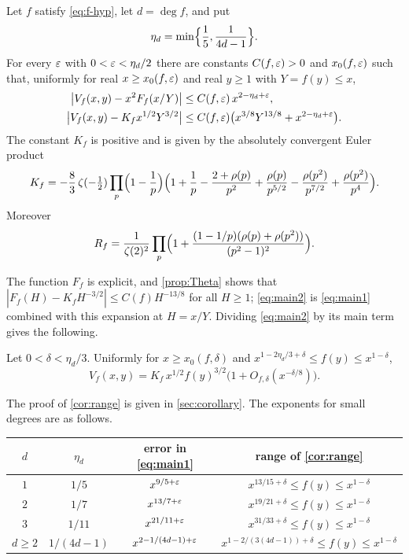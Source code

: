 \begin{theorem}\label{thm:main}
Let $f$ satisfy \eqref{eq:f-hyp}, let $d=\deg f$, and put
\[
\eta_d=\min\Bigl\{\frac15,\frac1{4d-1}\Bigr\}.
\]
For every $\varepsilon$ with $0<\varepsilon<\eta_d/2$ there are constants $C(f,\varepsilon)>0$ and $x_0(f,\varepsilon)$ such that, uniformly for real $x\ge x_0(f,\varepsilon)$ and real $y\ge1$ with $Y=f(y)\le x$,
\begin{align}
\bigl|V_f(x,y)-x^2F_f(x/Y)\bigr|&\le C(f,\varepsilon)\,x^{2-\eta_d+\varepsilon},\label{eq:main1}\\
\bigl|V_f(x,y)-K_fx^{1/2}Y^{3/2}\bigr|&\le C(f,\varepsilon)\bigl(x^{3/8}Y^{13/8}+x^{2-\eta_d+\varepsilon}\bigr).\label{eq:main2}
\end{align}
The constant $K_f$ is positive and is given by the absolutely convergent Euler product
\begin{equation}\label{eq:K-intro}
K_f=-\frac83\,\zeta(-\tfrac12)\prod_p\Bigl(1-\frac1p\Bigr)\Bigl(1+\frac1p-\frac{2+\rho(p)}{p^2}+\frac{\rho(p)}{p^{5/2}}-\frac{\rho(p^2)}{p^{7/2}}+\frac{\rho(p^2)}{p^4}\Bigr).
\end{equation}
Moreover
\begin{equation}\label{eq:R-intro}
R_f=\frac1{\zeta(2)^2}\prod_p\Bigl(1+\frac{(1-1/p)(\rho(p)+\rho(p^2))}{(p^2-1)^2}\Bigr).
\end{equation}
\end{theorem}

The function $F_f$ is explicit, and \cref{prop:Theta} shows that $|F_f(H)-K_fH^{-3/2}|\le C(f)H^{-13/8}$ for all $H\ge1$; \eqref{eq:main2} is \eqref{eq:main1} combined with this expansion at $H=x/Y$. Dividing \eqref{eq:main2} by its main term gives the following.

\begin{corollary}\label{cor:range}
Let $0<\delta<\eta_d/3$. Uniformly for $x\ge x_0(f,\delta)$ and $x^{1-2\eta_d/3+\delta}\le f(y)\le x^{1-\delta}$,
\[
V_f(x,y)=K_f\,x^{1/2}f(y)^{3/2}\bigl(1+O_{f,\delta}(x^{-\delta/8})\bigr).
\]
\end{corollary}

The proof of \cref{cor:range} is given in \cref{sec:corollary}. The exponents for small degrees are as follows.

\begin{center}
\begin{tabular}{@{}cccc@{}}
\toprule
$d$ & $\eta_d$ & error in \eqref{eq:main1} & range of \cref{cor:range}\\
\midrule
$1$ & $1/5$ & $x^{9/5+\varepsilon}$ & $x^{13/15+\delta}\le f(y)\le x^{1-\delta}$\\
$2$ & $1/7$ & $x^{13/7+\varepsilon}$ & $x^{19/21+\delta}\le f(y)\le x^{1-\delta}$\\
$3$ & $1/11$ & $x^{21/11+\varepsilon}$ & $x^{31/33+\delta}\le f(y)\le x^{1-\delta}$\\
$d\ge2$ & $1/(4d-1)$ & $x^{2-1/(4d-1)+\varepsilon}$ & $x^{1-2/(3(4d-1))+\delta}\le f(y)\le x^{1-\delta}$\\
\bottomrule
\end{tabular}
\end{center}

